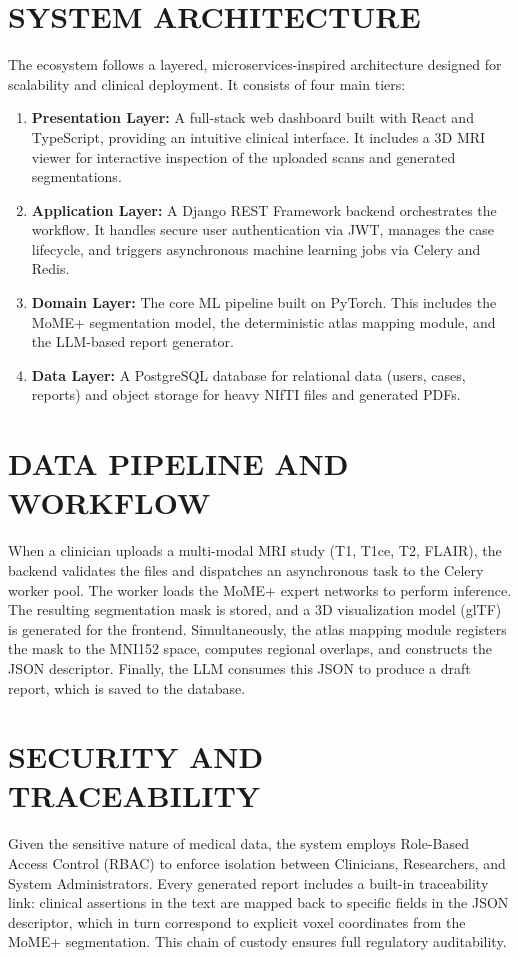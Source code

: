 \documentclass[12pt, a4paper]{report}
\begin{document}
\section{SYSTEM ARCHITECTURE}
The ecosystem follows a layered, microservices-inspired architecture designed for scalability and clinical deployment. It consists of four main tiers:
\begin{enumerate}
    \item \textbf{Presentation Layer:} A full-stack web dashboard built with React and TypeScript, providing an intuitive clinical interface. It includes a 3D MRI viewer for interactive inspection of the uploaded scans and generated segmentations.
    \item \textbf{Application Layer:} A Django REST Framework backend orchestrates the workflow. It handles secure user authentication via JWT, manages the case lifecycle, and triggers asynchronous machine learning jobs via Celery and Redis.
    \item \textbf{Domain Layer:} The core ML pipeline built on PyTorch. This includes the MoME+ segmentation model, the deterministic atlas mapping module, and the LLM-based report generator.
    \item \textbf{Data Layer:} A PostgreSQL database for relational data (users, cases, reports) and object storage for heavy NIfTI files and generated PDFs.
\end{enumerate}

\section{DATA PIPELINE AND WORKFLOW}
When a clinician uploads a multi-modal MRI study (T1, T1ce, T2, FLAIR), the backend validates the files and dispatches an asynchronous task to the Celery worker pool. The worker loads the MoME+ expert networks to perform inference. The resulting segmentation mask is stored, and a 3D visualization model (glTF) is generated for the frontend. Simultaneously, the atlas mapping module registers the mask to the MNI152 space, computes regional overlaps, and constructs the JSON descriptor. Finally, the LLM consumes this JSON to produce a draft report, which is saved to the database.

\section{SECURITY AND TRACEABILITY}
Given the sensitive nature of medical data, the system employs Role-Based Access Control (RBAC) to enforce isolation between Clinicians, Researchers, and System Administrators. Every generated report includes a built-in traceability link: clinical assertions in the text are mapped back to specific fields in the JSON descriptor, which in turn correspond to explicit voxel coordinates from the MoME+ segmentation. This chain of custody ensures full regulatory auditability.
\end{document}
